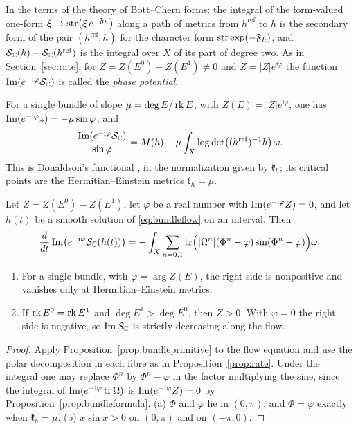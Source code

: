 In the terms of the theory of Bott--Chern forms: the integral of the
form-valued one-form $\xi\mapsto\operatorname{str}\bigl(\xi\,e^{-\mathfrak F_h}\bigr)$ along
a path of metrics from $h^{\mathrm{ref}}$ to $h$ is the secondary form of the
pair $(h^{\mathrm{ref}},h)$ for the character form
$\operatorname{str}\exp(-\mathfrak F_h)$, and $\mathcal S_{\mathbb C}(h)-\mathcal S_{\mathbb C}(h^{\mathrm{ref}})$ is
the integral over $X$ of its part of degree two. As in Section~\ref{sec:rate}, for
$Z=Z(E^0)-Z(E^1)\neq0$ and $Z=|Z|e^{\ii\varphi}$ the function
$\operatorname{Im}(e^{-\mathrm i\varphi}\mathcal S_{\mathbb C})$ is called the \emph{phase potential}.

For a single bundle of slope $\mu=\deg E/\operatorname{rk} E$, with
$Z(E)=|Z|e^{\ii\varphi}$, one has $\operatorname{Im}(e^{-\mathrm i\varphi}z)=-\mu\sin\varphi$, and
\[
 \frac{\operatorname{Im}(e^{-\mathrm i\varphi}\mathcal S_{\mathbb C})}{\sin\varphi}
 =M(h)-\mu\int_X\log\det\bigl((h^{\mathrm{ref}})^{-1}h\bigr)\,\omega .
\]
This is Donaldson's functional \cite{don85}, in the normalization given by
$\mathfrak k_h$; its critical points are the Hermitian--Einstein metrics
$\mathfrak k_h=\mu$.

\begin{proposition}\label{prop:bundlerate}
Let $Z=Z(E^0)-Z(E^1)$, let $\varphi$ be a real number with
$\operatorname{Im}(e^{-\mathrm i\varphi}Z)=0$, and let $h(t)$ be a smooth solution of
\eqref{eq:bundleflow} on an interval. Then
\[
 \frac d{dt}\operatorname{Im}\bigl(e^{-\mathrm i\varphi}\mathcal S_{\mathbb C}(h(t))\bigr)
 =-\int_X\sum_{n=0,1}\operatorname{tr}\Bigl(|\Omega^n|(\Phi^n-\varphi)\sin(\Phi^n-\varphi)\Bigr)\omega .
\]
\begin{enumerate}
\item[(a)] For a single bundle, with $\varphi=\arg Z(E)$, the right side is
 nonpositive and vanishes only at Hermitian--Einstein metrics.
\item[(b)] If $\operatorname{rk} E^0=\operatorname{rk} E^1$ and $\deg E^1>\deg E^0$, then $Z>0$.
 With $\varphi=0$ the right side is negative, so $\operatorname{Im}\mathcal S_{\mathbb C}$ is
 strictly decreasing along the flow.
\end{enumerate}
\end{proposition}

\begin{proof}
Apply Proposition~\ref{prop:bundleprimitive} to the flow equation and
use the polar decomposition in each fibre as in Proposition~\ref{prop:rate}.
Under the integral one may replace $\Phi^n$ by $\Phi^n-\varphi$ in the
factor multiplying the sine, since the integral of
$\operatorname{Im}(e^{-\mathrm i\varphi}\operatorname{tr}\Omega)$ is $\operatorname{Im}(e^{-\mathrm i\varphi}Z)=0$ by
Proposition~\ref{prop:bundleformula}. (a) $\Phi$ and $\varphi$ lie
in $(0,\pi)$, and $\Phi=\varphi$ exactly when
$\mathfrak k_h=\mu$. (b) $x\sin x>0$ on $(0,\pi)$ and on $(-\pi,0)$.
\end{proof}

